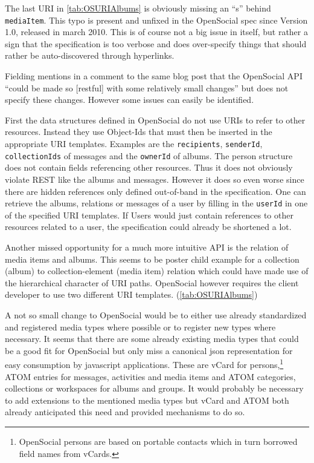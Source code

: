 \documentclass[12pt,a4paper]{scrartcl}		%
\begin{document}
The last URI in \autoref{tab:OSURIAlbums} is obviously missing an ``s'' behind
\texttt{mediaItem}. This typo is present and unfixed in the OpenSocial spec
since Version 1.0, released in march 2010. This is of course not a big issue in
itself, but rather a sign that the specification is too verbose and does
over-specify things that should rather be auto-discovered through hyperlinks.

Fielding mentions in a comment to the same blog post that the OpenSocial API
``could be made so [restful] with some relatively small changes'' but does not
specify these changes. However some issues can easily be identified.

First the data structures defined in OpenSocial do not use URIs to refer to
other resources. Instead they use Object-Ids that must then be inserted in the
appropriate URI templates. Examples are the \texttt{recipients},
\texttt{senderId}, \texttt{collectionIds} of messages and the \texttt{ownerId}
of albums. The person structure does not contain fields referencing other
resources. Thus it does not obviously violate REST like the albums and
messages. However it does so even worse since there are hidden references only
defined out-of-band in the specification. One can retrieve the albums, relations
or messages of a user by filling in the \texttt{userId} in one of the specified
URI templates. If Users would just contain references to other resources related
to a user, the specification could already be shortened a lot.

Another missed opportunity for a much more intuitive API is the relation of
media items and albums. This seems to be poster child example for a collection
(album) to collection-element (media item) relation which could have made use of
the hierarchical character of URI paths. OpenSocial however requires the client
developer to use two different URI templates. (\autoref{tab:OSURIAlbums})

A not so small change to OpenSocial would be to either use already standardized
and registered media types where possible or to register new types where
necessary. It seems that there are some already existing media types that could
be a good fit for OpenSocial but only miss a canonical json representation for
easy consumption by javascript applications. These are vCard for
persons,\footnote{OpenSocial persons are based on portable contacts which in
  turn borrowed field names from vCards.} ATOM entries\cite{RFC4287} for
messages, activities and media items and ATOM categories, collections or
workspaces\cite{RFC5023} for albums and groups. It would probably be necessary
to add extensions to the mentioned media types but vCard and ATOM both already
anticipated this need and provided mechanisms to do so.
\end{document}
